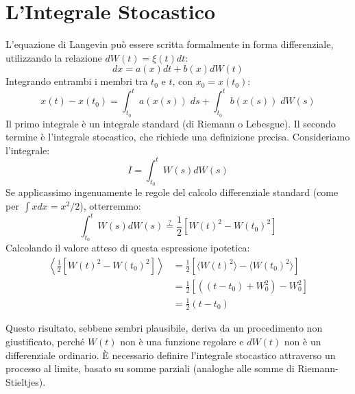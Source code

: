 \section{L'Integrale Stocastico}
L'equazione di Langevin può essere scritta formalmente in forma differenziale, utilizzando la relazione $dW(t) = \xi(t)dt$:
\begin{equation}
dx = a(x) dt + b(x) dW(t)
\end{equation}
Integrando entrambi i membri tra $t_0$ e $t$, con $x_0=x(t_0)$:
\begin{equation}
x(t) - x(t_0) = \int_{t_0}^{t} a(x(s))\; ds + \int_{t_0}^{t} b(x(s)) \; dW(s)
\end{equation}
Il primo integrale è un integrale standard (di Riemann o Lebesgue). Il secondo termine è l'integrale stocastico, che richiede una definizione precisa.
Consideriamo l'integrale:
\begin{equation}
I=\int_{t_0}^{t} W(s) dW(s)
\end{equation}
Se applicassimo ingenuamente le regole del calcolo differenziale standard (come per $\int x dx = x^2/2$), otterremmo:
\begin{equation}
\int_{t_0}^{t} W(s) dW(s) \stackrel{?}{=} \frac{1}{2} [W(t)^2 - W(t_0)^2]
\end{equation}
Calcolando il valore atteso di questa espressione ipotetica:
\begin{equation}
\begin{aligned}
\left\langle \frac{1}{2}[W(t)^2 - W(t_0)^2] \right\rangle &= \frac{1}{2}[\langle W(t)^2 \rangle - \langle W(t_0)^2 \rangle] \\
&= \frac{1}{2}[((t-t_0)+W_0^2) - W_0^2] \\
&= \frac{1}{2}(t-t_0)
\end{aligned}
\end{equation}

\begin{tcolorbox}[colback=colorF!5,colframe=colorF, title=Attenzione]
Questo risultato, sebbene sembri plausibile, deriva da un procedimento non giustificato, perché $W(t)$ non è una funzione regolare e $dW(t)$ non è un differenziale ordinario. È necessario definire l'integrale stocastico attraverso un processo al limite, basato su somme parziali (analoghe alle somme di Riemann-Stieltjes).
\end{tcolorbox}

